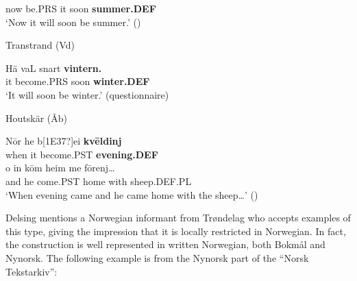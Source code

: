 now  be.PRS  it  soon  \textbf{summer.DEF}\\

\glt ‘Now it will soon be summer.’ (\citet{Broberg1936})

\z

\item 

Transtrand (Vd) 



 \ea\label{}
\gll Hä  vaL  snart  \textbf{vintern.}\\


it  become.PRS  soon  \textbf{winter.DEF}\\

\glt ‘It will soon be winter.’ (questionnaire)

\z

\item 

Houtskär (Åb)



 \ea\label{}
\gll N\=or  he  b[1E37?]ei  \textbf{kv}\textbf{\=e}\textbf{ldinj}\\


when  it  become.PST  \textbf{evening.DEF}\\

 \ea\label{}
\gll o  in  k\=om  heim  me  f\=orenj…\\


and  he  come.PST  home  with  sheep.DEF.PL\\

\glt ‘When evening came and he came home with the sheep…’ (\citet[38]{Lundell1936})

\z

Delsing mentions a Norwegian informant from Trøndelag who accepts examples of this type, giving the impression that it is locally restricted in Norwegian. In fact, the construction is well represented in written Norwegian, both Bokmål and Nynorsk. The following example is from the Nynorsk part of the “Norsk Tekstarkiv”: 

